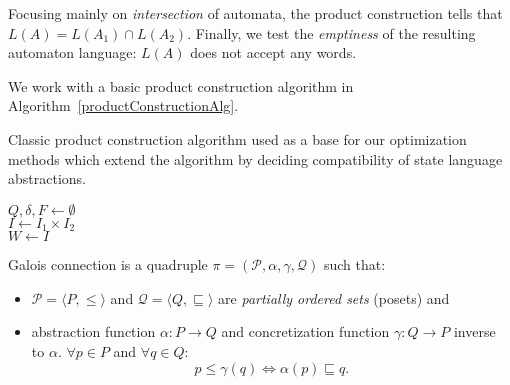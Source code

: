 Focusing mainly on \emph{intersection} of automata, the product construction tells that $ L(A) = L(A_1) \cap L(A_2) $. Finally, we test the \emph{emptiness} of the resulting automaton language: $L(A)$ does not accept any words.

We work with a basic product construction algorithm in Algorithm~\ref{productConstructionAlg}.

\begin{algorithm}
\caption{Classic product construction algorithm used as a base for our optimization methods which extend the algorithm by deciding compatibility of state language abstractions.}\label{productConstructionAlg}
\DontPrintSemicolon
{}
\BlankLine
$Q, \delta, F \gets \emptyset$ \\
$I \gets I_1 \times I_2$ \\
$W \gets  I$

\end{algorithm}

\begin{definition}

Galois connection is a quadruple $\pi = (\mathcal{P}, \alpha, \gamma, \mathcal{Q})$ such that:

\begin{itemize}
    \item $\mathcal{P} = \langle P, \leq \rangle$ and $\mathcal{Q} = \langle Q, \sqsubseteq \rangle$ are \emph{partially ordered sets} (posets) and
    \item abstraction function $\alpha : P \rightarrow Q$ and concretization function $\gamma : Q \rightarrow P$ inverse to $\alpha$. $\forall p \in P$ and $\forall q \in Q$:
    \[
        p \leq \gamma(q) \Leftrightarrow \alpha(p) \sqsubseteq q \text{.}
    \]
\end{itemize}

\end{definition}

